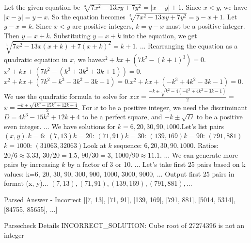 \begingroup\raggedleft
\begin{geminils}{\geminiheader}
Let the given equation be $\sqrt[3]{7x^2-13xy+7y^2} = |x-y|+1.$
Since $x<y$, we have $|x-y| = y-x$. So the equation becomes $\sqrt[3]{7x^2-13xy+7y^2} = y-x+1.$
Let $y-x = k$. Since $x<y$ are positive integers, $k = y-x$ must be a positive integer. Then $y = x+k$. Substituting $y=x+k$ into the equation, we get$\sqrt[3]{7x^2-13x(x+k)+7(x+k)^2} = k+1.$
...
Rearranging the equation as a quadratic equation in $x$, we have$x^2 + kx + (7k^2 - (k+1)^3) = 0.$$x^2 + kx + (7k^2 - (k^3+3k^2+3k+1)) = 0.$$x^2 + kx + (7k^2 - k^3 - 3k^2 - 3k - 1) = 0.$$x^2 + kx + (-k^3 + 4k^2 - 3k - 1) = 0.$We use the quadratic formula to solve for $x$:$x = \frac{-k \pm \sqrt{k^2 - 4(-k^3 + 4k^2 - 3k - 1)}}{2} =$$x = \frac{-k \pm \sqrt{4k^3 - 15k^2 + 12k + 4}}{2}.$ For $x$ to be a positive integer, we need the discriminant $D = 4k^3 - 15k^2 + 12k + 4$ to be a perfect square, and $-k \pm \sqrt{D}$ to be a positive even integer.
...
We have solutions for $k=6, 20, 30, 90, 1000$.Let's list pairs $(x, y)$.$k=6$: $(7, 13)$$k=20$: $(71, 91)$$k=30$: $(139, 169)$$k=90$: $(791, 881)$$k=1000$: $(31063, 32063)$Look at $k$ sequence: $6, 20, 30, 90, 1000$. Ratios: $20/6 \approx 3.33$, $30/20 = 1.5$, $90/30 = 3$, $1000/90 \approx 11.1$.
...
We can generate more pairs by increasing $k$ by a factor of 3 or 10. ...
Let's take first 25 pairs based on k values: k=6, 20, 30, 90, 300, 900, 1000, 3000, 9000, ... Output first 25 pairs in format (x, y)...
$\boxed{(7,13), (71,91), (139,169), (791,881), ...}$
\end{geminils}
\endgroup
\begin{parsecheckwrong}{Parsed Answer - Incorrect}
[[7, 13], [71, 91], [139, 169], [791, 881], [5014, 5314], [84755, 85655], ...]
\end{parsecheckwrong}

\begin{parsecheckwrong}{Parsecheck Details}
INCORRECT_SOLUTION: Cube root of 27274396 is not an integer
\end{parsecheckwrong}
